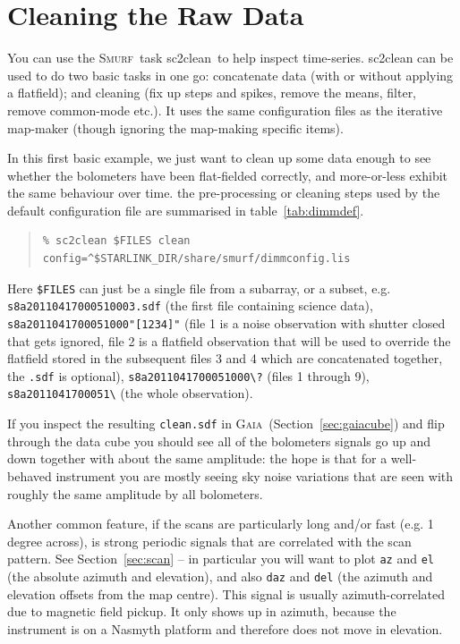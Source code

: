 \documentclass[twoside,11pt]{article}
\newcommand{\xref}[3]{#1}
\newcommand{\xlabel}[1]{}
\renewcommand{\_}{\texttt{\symbol{95}}}
\newenvironment{myquote}{\begin{quote}\begin{small}}{\end{small}\end{quote}}
\newcommand{\gaia}{\xref{\textsc{Gaia}}{sun214}{}}
\newcommand{\smurf}{\xref{\textsc{Smurf}}{sun258}{}}
\newcommand{\task}[1]{\textsf{#1}}
\newcommand{\clean}{\xref{\task{sc2clean}}{sun258}{SC2CLEAN}}
\begin{document}
\newpage
\appendix

\section{\xlabel{app_clean}Cleaning the Raw Data}
\label{app:clean}

You can use the \smurf\ task \clean\ to help inspect time-series.
\task{sc2clean} can be used to do two basic tasks in one go: concatenate data
(with or without applying a flatfield); and cleaning (fix up steps and
spikes, remove the means, filter, remove common-mode etc.). It uses
the same configuration files as the iterative map-maker (though
ignoring the map-making specific items).

In this first basic example, we just want to clean up some data enough
to see whether the bolometers have been flat-fielded correctly, and
more-or-less exhibit the same behaviour over time. the pre-processing
or cleaning steps used by the default configuration file are
summarised in table~\ref{tab:dimmdef}.

\begin{myquote}
\begin{verbatim}
% sc2clean $FILES clean config=^$STARLINK_DIR/share/smurf/dimmconfig.lis
\end{verbatim}
\end{myquote}

Here \texttt{\$FILES} can just be a single file from a subarray, or a
subset, e.g. \texttt{s8a20110417\_00051\_0003.sdf} (the first file
containing science data), \texttt{s8a20110417\_00051\_000"[1234]"}
(file 1 is a noise observation with shutter closed that gets ignored,
file 2 is a flatfield observation that will be used to override the
flatfield stored in the subsequent files 3 and 4 which are
concatenated together, the \texttt{.sdf} is optional),
\texttt{s8a20110417\_00051\_000\textbackslash?} (files 1 through 9),
\texttt{s8a20110417\_00051\_\textbackslash*} (the whole observation).

If you inspect the resulting \texttt{clean.sdf} in \gaia\
(Section~\ref{sec:gaiacube}) and flip through the data cube you should
see all of the bolometers signals go up and down together with about
the same amplitude: the hope is that for a well-behaved instrument you
are mostly seeing sky noise variations that are seen with roughly the
same amplitude by all bolometers.

Another common feature, if the scans are particularly long and/or fast
(e.g. 1\,degree across), is strong periodic signals that are correlated
with the scan pattern. See Section~\ref{sec:scan} -- in particular
you will want to plot \texttt{az} and \texttt{el} (the absolute
azimuth and elevation), and also \texttt{daz} and \texttt{del} (the
azimuth and elevation offsets from the map centre). This signal is
usually azimuth-correlated due to magnetic field pickup. It only shows
up in azimuth, because the instrument is on a Nasmyth platform and
therefore does not move in elevation.
\end{document}

